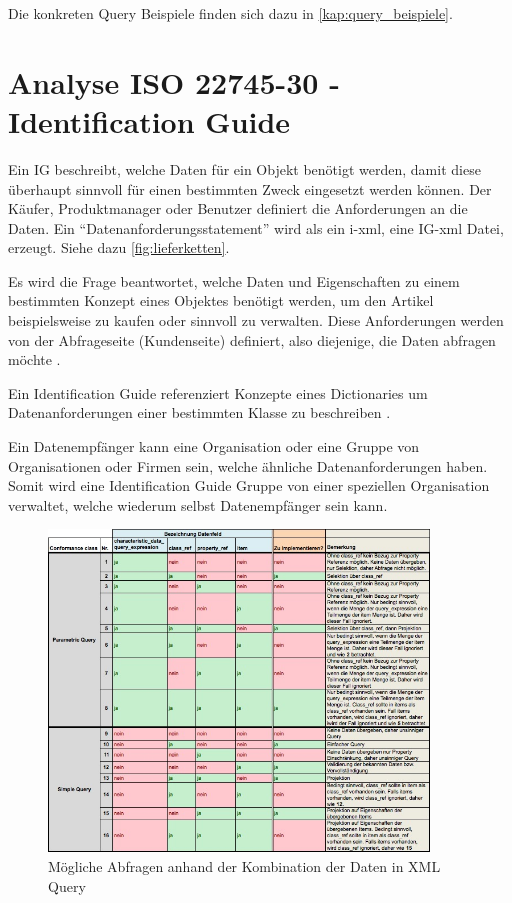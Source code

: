 Die konkreten Query Beispiele finden sich dazu in \autoref{kap:query_beispiele}.

\section{Analyse ISO 22745-30 - Identification Guide}\label{kap:identification_guide}

Ein \gls{IG} beschreibt, welche Daten für ein Objekt benötigt werden, damit diese überhaupt sinnvoll für einen bestimmten Zweck eingesetzt werden können. Der Käufer, Produktmanager oder Benutzer definiert die Anforderungen an die Daten. Ein  \enquote{Datenanforderungsstatement} wird als ein i-xml, eine \gls{IG}-xml Datei, erzeugt. Siehe dazu \autoref{fig:lieferketten}. 

Es wird die Frage beantwortet, welche Daten und Eigenschaften zu einem bestimmten Konzept eines Objektes benötigt werden, um den Artikel beispielsweise zu kaufen oder sinnvoll zu verwalten. Diese Anforderungen werden von der Abfrageseite (Kundenseite) definiert, also diejenige, die Daten abfragen möchte \citep[Vergl.][]{bensonQuality}. 

Ein Identification Guide referenziert Konzepte eines Dictionaries um Datenanforderungen einer bestimmten Klasse zu beschreiben \citep[Vergl.][Kap. 5]{iso22745-30}.

Ein Datenempfänger kann eine Organisation oder eine Gruppe von Organisationen oder Firmen sein, welche ähnliche Datenanforderungen haben. Somit wird eine Identification Guide Gruppe von einer speziellen Organisation verwaltet, welche wiederum selbst Datenempfänger sein kann.  

\begin{figure}[htbp]
	\centering
		\includegraphics[width=0.90\textwidth]{images/queries.jpg}
	\caption{Mögliche Abfragen anhand der Kombination der Daten in XML Query}
	\label{fig:query_kombinationen}
\end{figure}

